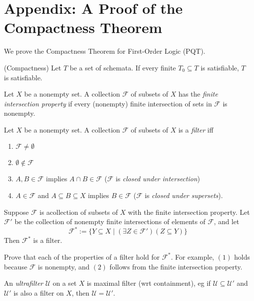 \section{Appendix: A Proof of the Compactness Theorem}
We prove the Compactness Theorem for First-Order Logic (PQT). 

\begin{theorem}(Compactness)
Let $T$ be a set of schemata. If every finite $T_0 \subseteq T$ is satisfiable, $T$ is satisfiable. 
\end{theorem}

\begin{definition}
Let $X$ be a nonempty set. A collection $\mathcal{F}$ of subsets of $X$ has the \emph{finite intersection property} if every (nonempty) finite intersection of sets in $\mathcal{F}$ is nonempty. 
\end{definition}

\begin{definition}
Let $X$ be a nonempty set. A collection $\mathcal{F}$ of subsets of $X$ is a \emph{filter} iff
\begin{enumerate}
    \item $\mathcal{F} \neq \emptyset$
    \item $\emptyset \not \in \mathcal{F}$
    \item $A, B \in \mathcal{F}$ implies $A \cap B \in \mathcal{F}$ ($\mathcal{F}$ is \emph{closed under intersection})
    \item $A \in \mathcal{F}$ and $A \subseteq B \subseteq X$ implies $B \in \mathcal{F}$ ($\mathcal{F}$ is \emph{closed under supersets}). 
\end{enumerate}
\end{definition}


\begin{lemma}
Suppose $\mathcal{F}$ is acollection of subsets of $X$ with the finite intersection property. Let $\mathcal{F}'$ be the collection of nonempty finite intersections of elements of $\mathcal{F}$, and let 
\[
    \mathcal{F}^* := \{Y \subseteq X \mid (\exists Z \in \mathcal{F}')(Z \subseteq Y)\}
\]
Then $\mathcal{F}^*$ is a filter. 
\end{lemma}
\begin{aside}
    Prove that each of the properties of a filter hold for $\mathcal{F}^*$. For example, $(1)$ holds because $\mathcal{F}$ is nonempty, and $(2)$ follows from the finite intersection property. 
\end{aside}

\begin{definition}
An \emph{ultrafilter} $\mathcal{U}$ on a set $X$ is maximal filter (wrt containment), eg if $\mathcal{U} \subseteq \mathcal{U}'$ and $\mathcal{U}'$ is also a filter on $X$, then $\mathcal{U} = \mathcal{U}'$. 
\end{definition}